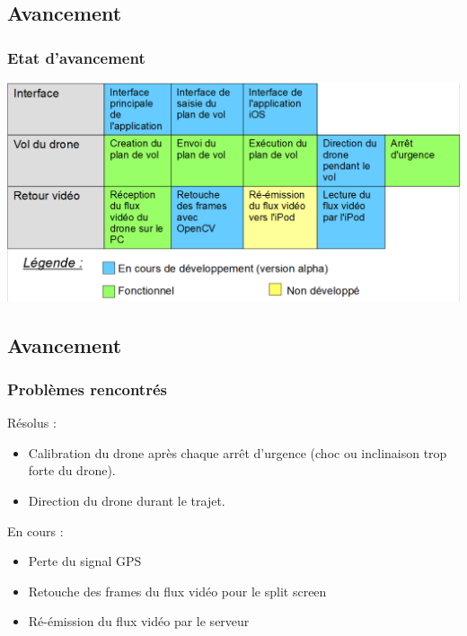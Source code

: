 \documentclass{beamer}
\begin{document}
	\begin{frame}
		\section{Avancement}
		\begin{center}
		\frametitle{Etat d'avancement}
         \includegraphics[scale=0.35]{Avancement_projet.PNG}
        \end{center}
	\end{frame}
	
	
	
	\begin{frame}
		\section{Avancement}
		\begin{center}
		\frametitle{Problèmes rencontrés}
	    	Résolus :
             \begin{itemize}
                \item Calibration du drone après chaque arrêt d'urgence (choc ou inclinaison trop forte du drone).
                \item Direction du drone durant le trajet.
            \end{itemize}
            En cours :
            \begin{itemize}
                \item Perte du signal GPS
                \item Retouche des frames du flux vidéo pour le split screen
                \item Ré-émission du flux vidéo par le serveur
            \end{itemize}
		\end{center}
	\end{frame}
	
	
\end{document}
